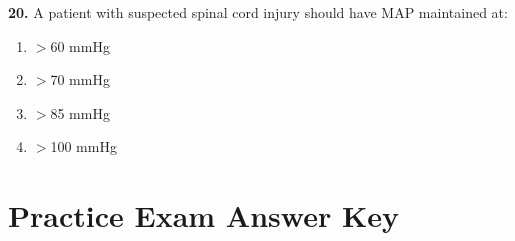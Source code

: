 \documentclass[11pt]{article}
\begin{document}
\vspace{0.3cm}

\textbf{20.} A patient with suspected spinal cord injury should have MAP maintained at:

\begin{enumerate}[label=\Alph*.]
    \item $>$60 mmHg
    \item $>$70 mmHg
    \item $>$85 mmHg
    \item $>$100 mmHg
\end{enumerate}

\newpage
\section*{Practice Exam Answer Key}
\end{document}

